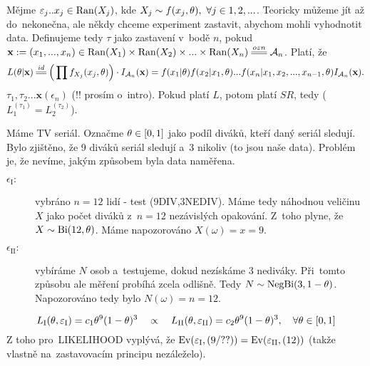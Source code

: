 \begin{example}
	Mějme $\varepsilon_j..x_j\in\mathop{\mathrm{Ran}}(X_j)$, kde $X_j\sim f(x_j,\theta),~\forall j\in 1,2,...$. Teoricky můžeme jít až do~nekonečna, ale někdy chceme experiment zastavit, abychom mohli vyhodnotit data. Definujeme tedy $\tau$ jako zastavení v~bodě $n$, pokud $\textbf{x}:=(x_1,...,x_n)\in\Ran(X_1)\times\Ran(X_2)\times...\times\Ran(X_n)\equal{ozn}\Aa_n$. Platí, že
	$$ L(\t|\textbf{x})\equal{id}\Big(\prod f_{X_j}(x_j,\t) \Big)\cdot I_{\Aa_n}(\textbf{x})=f(x_1|\t)f(x_2|x_1,\t)...f(x_n|x_1,x_2,...,x_{n-1},\t)I_{\Aa_n}(\textbf{x}).$$
	$\tau_1,\tau_2... \textbf{x}(\epsilon_n)$ (!! prosím o~intro). Pokud platí $L$, potom platí $SR$, tedy ($L_1^{(\tau_1)}=L_2^{(\tau_2)}$).
\end{example}
\begin{example}
	Máme TV seriál. Označme $\theta\in[0,1]$ jako podíl diváků, kteří daný seriál sledují. Bylo zjištěno, že 9 diváků seriál sledují a~3 nikoliv (to jsou naše data). Problém je, že nevíme, jakým způsobem byla data naměřena. 
	\begin{description}
		\item[$\epsilon_\mathrm{I}:$] vybráno $n=12$ lidí - test (9DIV,3NEDIV). Máme tedy náhodnou veličinu $X$ jako počet diváků z~$n=12$ nezávislých opakování. Z~toho plyne, že $X\sim \mathrm{Bi}(12,\theta)$. Máme napozorováno $X(\omega)=x=9$.
		\item[$\epsilon_\mathrm{II}:$] vybíráme $N$ osob a~testujeme, dokud nezískáme $3$ nediváky. Při~tomto způsobu ale měření probíhá zcela odlišně. Tedy $N\sim\mathrm{NegBi}(3,1-\theta)$. Napozorováno tedy bylo $N(\omega)=n=12$.
	\end{description}
$$ L_\mathrm{I}(\theta,\varepsilon_\mathrm{I})=c_1\theta^9(1-\theta)^3\quad\propto\quad L_\mathrm{II}(\theta,\varepsilon_\mathrm{II})=c_2\theta^9(1-\theta)^3,\quad \forall\theta\in[0,1] $$
Z toho pro~LIKELIHOOD vyplývá, že $\mathrm{Ev}(\varepsilon_\mathrm{I},(9/??))=\mathrm{Ev}(\varepsilon_\mathrm{II},(12))$ (takže vlastně na~zastavovacím principu nezáleželo).
\end{example}

